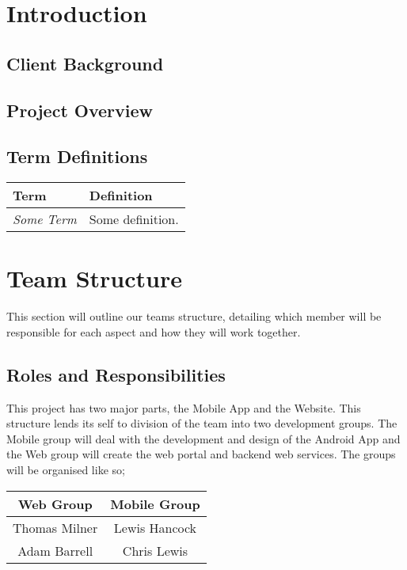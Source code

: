 \documentclass[11pt,a4paper]{article}
\begin{document}


\tableofcontents

\section{Introduction}

\subsection{Client Background}

\subsection{Project Overview}
\label{sec:project-overview}

\subsection{Term Definitions}
\label{sec:terms}

\begin{tabular}{|p{2.5cm}p{13cm}|}
\hline 
\textbf{Term} & \textbf{Definition} \\
\hline \hline
\emph{Some Term} & Some definition.\\
\hline
\end{tabular}

\newpage



\section{Team Structure}
\label{sec:team-structure}
This section will outline our teams structure, detailing which member will be responsible for each aspect and how they will work together. 

\subsection{Roles and Responsibilities}
This project has two major parts, the Mobile App and the Website. This structure lends its self to division of the team into two development groups. The Mobile group will deal with the development and design of the Android App and the Web group will create the web portal and backend web services. The groups will be organised like so;  
\begin{table}[h]
\begin{center}
\begin{tabular}{|c|c|}
\hline
\textbf{Web Group} & \textbf{Mobile Group} \\
\hline
Thomas Milner & Lewis Hancock \\
Adam Barrell & Chris Lewis \\ \hline
\end{tabular}
\end{center}
\end{table}%
\end{document}
